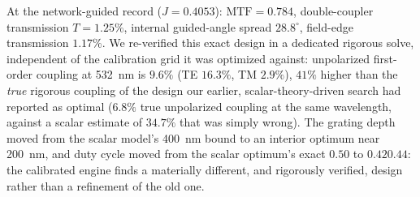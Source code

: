 \documentclass[10pt,twocolumn]{article}
\begin{document}
At the network-guided record ($J=0.4053$): $\mathrm{MTF}=0.784$,
double-coupler transmission $T=1.25\%$, internal guided-angle spread
$28.8^\circ$, field-edge transmission $1.17\%$. We re-verified this exact
design in a dedicated rigorous solve, independent of the calibration grid
it was optimized against: unpolarized first-order coupling at 532~nm is
$9.6\%$ (TE $16.3\%$, TM $2.9\%$), $41\%$ higher than the \emph{true}
rigorous coupling of the design our earlier, scalar-theory-driven search
had reported as optimal ($6.8\%$ true unpolarized coupling at the same
wavelength, against a scalar estimate of $34.7\%$ that was simply wrong).
The grating depth moved from the scalar model's 400~nm bound to an
interior optimum near 200~nm, and duty cycle moved from the scalar
optimum's exact $0.50$ to $0.42$\textendash$0.44$: the
calibrated engine finds a materially different, and rigorously verified,
design rather than a refinement of the old one.
\end{document}
